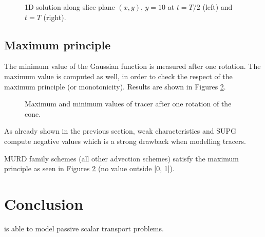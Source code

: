 \begin{figure}[H]
\begin{minipage}[t]{0.50\textwidth}
 \centering
\end{minipage}
\begin{minipage}[t]{0.50\textwidth}
 \centering
\end{minipage}
\caption{1D solution along slice plane $(x,y)$, $y=10$ at $t=T/2$ (left) and $t=T$ (right).}
\label{t3d:cone:1dslice}
\end{figure}


\subsection{Maximum principle}

The minimum value of the Gaussian function is measured after one rotation.
The maximum value is computed as well, in order to check the respect of the
maximum principle (or monotonicity).
Results are shown in Figures \ref{t3d:cone:minmax}.

\begin{figure}[H]
\centering
{}
\caption{Maximum and minimum values of tracer after one rotation of the cone.}
\label{t3d:cone:minmax}
\end{figure}

As already shown in the previous section, weak characteristics and SUPG compute
negative values which is a strong drawback when modelling tracers.

MURD family schemes (all other advection schemes) satisfy the maximum principle
as seen in Figures \ref{t3d:cone:minmax} (no value outside [0, 1]).

%
%
%

\section{Conclusion}
 is able to model passive scalar transport problems.

